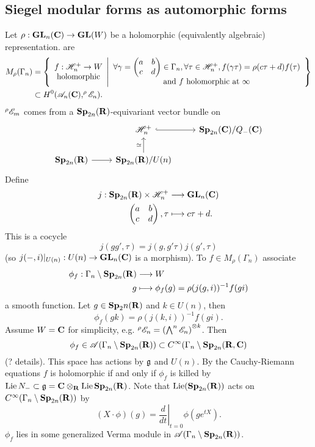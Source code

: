 \subsection{Siegel modular forms as automorphic forms}
Let $\rho:\GL_n(\bb{C})\to \GL(W)$ be a holomorphic (equivalently algebraic) representation.  are
\begin{align*}
	M_\rho(\Gamma_n) &= \left\{ \begin{array}{c} f:\H_n^{+}\to W \\ \text{holomorphic} \end{array} \middle| \begin{array}{c}
		\forall \gamma = \begin{pmatrix} a & b \\ c & d \end{pmatrix} \in \Gamma_n,\forall \tau\in \H_n^{+}, f(\gamma \tau) = \rho(c\tau+d)f(\tau)\\
		\text{and }f\text{ holomorphic at }\infty
	\end{array} \right\} \\
			 &\subset H^{0}(\CA_n(\bb{C}),^{\rho}\CE_n).
\end{align*}
$^{\rho}\mathscr{E}_m$ comes from a $\mathbf{Sp}_{2n}(\mathbf{R})$-equivariant vector bundle on 
\[
\begin{tikzcd}
	& \H_n^{+} \ar[r,hook] & \Sp_{2n}(\bb{C}) /Q_-(\bb{C}) \\
	\Sp_{2n}(\R) \ar[r] & \Sp_{2n}(\R) /U(n) \ar[u,"\isoto"]
\end{tikzcd}
\] 
Define
\begin{align*}
	j: \mathbf{Sp}_{2n}(\mathbf{R})\times \mathscr H_n^{+} &\longrightarrow \mathbf{GL}_n(\mathbf{C}) \\
	\begin{pmatrix} a & b \\ c & d \end{pmatrix} , \tau &\longmapsto c\tau + d
.\end{align*}
This is a cocycle
\[
	j(gg',\tau) = j(g,g'\tau)j(g',\tau)
\] 
(so $j(-,i)|_{U(n)}:U(n)\to \GL_n(\bb{C})$ is a morphism). To $f\in M_\rho(\Gamma_n)$ associate
\begin{align*}
	\phi_f: \Gamma_n \setminus \mathbf{Sp}_{2n}(\mathbf{R}) &\longrightarrow W \\
	g &\longmapsto \phi_f(g) = \rho(j(g,i))^{-1}f(gi)
\end{align*}
a smooth function. Let $g\in \mathbf{Sp}_2n(\mathbf{R})$ and $k\in U(n)$, then
\[
\phi_f(gk) = \rho(j(k,i))^{-1}f(gi).
\]
Assume $W=\mathbf{C}$ for simplicity, e.g. $^{\rho}\mathscr{E}_n = \left( \bigwedge^{n}\mathscr{E}_n \right) ^{\otimes k}$. Then 
\[
	\phi_f\in \mathscr{A}(\Gamma_n\setminus \mathbf{Sp}_{2n}(\mathbf{R})) \subset C^{\infty}(\Gamma_n\setminus \mathbf{Sp}_{2n}(\mathbf{R}, \mathbf{C})	
\]
(? details). This space has actions by $\mathfrak{g}$ and $U(n)$. By the Cauchy-Riemann equations $f$ is holomorphic if and only if $\phi_f$ is killed by $\operatorname{Lie} N_-\subset \mathfrak{g}=\mathbf{C}\otimes_{\mathbf{R}}\operatorname{Lie} \mathbf{Sp}_{2n}(\mathbf{R})$. Note that $\operatorname{Lie}(\mathbf{Sp}_{2n}(\mathbf{R}))$ acts on $C^{\infty}(\Gamma_n\setminus \mathbf{Sp}_{2n}(\mathbf{R}))$ by
\[
\left( X\cdot \phi \right) (g) = \left.\frac{d}{dt}\right|_{t=0}\phi(ge^{tX}).
\] 
$\phi_f$ lies in some generalized Verma module in $\mathscr{A}(\Gamma_n\setminus \mathbf{Sp}_{2n}(\mathbf{R}))$.

